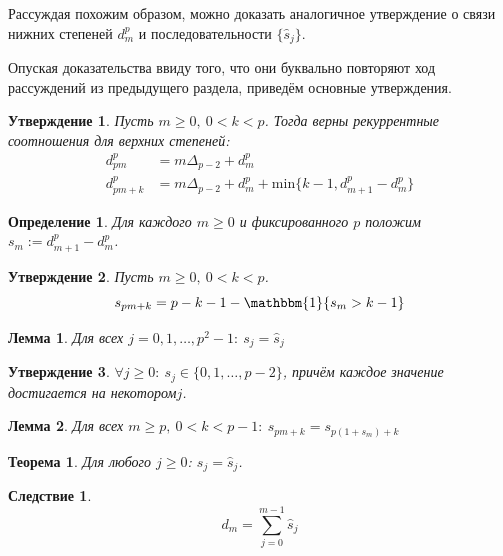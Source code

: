 \documentclass[14pt, a4paper, russian]{report}
\newtheorem{lemma}{\indent Лемма}
\newtheorem{theorem}{\indent Теорема}
\newtheorem{corollary}{\indent Следствие}
\newtheorem{definition}{\indent Определение}
\newtheorem{proposition}{\indent Утверждение}
\begin{document}
Рассуждая похожим образом, можно доказать аналогичное утверждение о связи нижних степеней $d_m^p$ и последовательности $\{\hat{s}_j\}$.

Опуская доказательства ввиду того, что они буквально повторяют ход рассуждений из предыдущего раздела, приведём основные утверждения.

\begin{proposition}
Пусть $m \ge 0,\ 0 < k < p$. Тогда верны рекуррентные соотношения для верхних степеней:
\begin{align*}
  d_{pm}^p &= m \Delta_{p-2} + d_m^p \\
  d_{pm+k}^p &= m \Delta_{p-2}+d_m^p + \mathrm{min}\{k-1, d_{m+1}^p-d_m^p\}
\end{align*}
\end{proposition}
\begin{definition}
Для каждого $m \ge 0$ и фиксированного $p$ положим $s_m := d_{m+1}^p - d_m^p $.
\end{definition}
\begin{proposition}
Пусть $m \ge 0,\ 0 < k < p$. 
\begin{equation}
s_{pm+k} = p-k-1 - \mathbbm{1}\{s_m > k-1\}
\end{equation}
\end{proposition}
\begin{lemma}
Для всех $j = 0, 1, \ldots, p^2-1:\ s_j=\hat{s}_j$
\end{lemma}
\begin{proposition}
$\forall j \ge 0:\ s_j \in \{0, 1, \ldots, p-2\}$, причём каждое значение достигается на некотором\nobreakspace$j$.
\end{proposition}
\begin{lemma}
Для всех $m \ge p,\ 0 < k < p-1:\ s_{pm+k}=s_{p(1+s_m)+k}$
\end{lemma}
\begin{theorem}\label{subst_th_2}
Для любого $j \ge 0$: $s_j=\hat{s}_j$.
\end{theorem}
\begin{corollary}\label{d_sum}
$$d_m = \sum\limits_{j=0}^{m-1} \hat{s}_j$$
\end{corollary}
\end{document}
